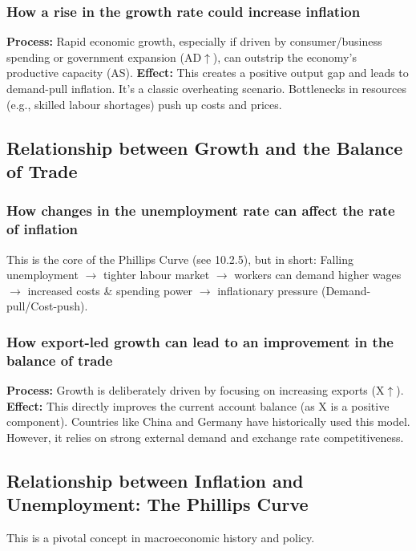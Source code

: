 \documentclass[11pt, a4paper, twoside]{book}
\begin{document}
\subsubsection{How a rise in the growth rate could increase inflation}

\textbf{Process:} Rapid economic growth, especially if driven by consumer/business spending or government expansion (AD$\uparrow$), can outstrip the economy's productive capacity (AS). \textbf{Effect:} This creates a positive output gap and leads to demand-pull inflation. It's a classic overheating scenario. Bottlenecks in resources (e.g., skilled labour shortages) push up costs and prices.

\subsection{Relationship between Growth and the Balance of Trade}

\subsubsection{How changes in the unemployment rate can affect the rate of inflation}

This is the core of the Phillips Curve (see 10.2.5), but in short: Falling unemployment $\rightarrow$ tighter labour market $\rightarrow$ workers can demand higher wages $\rightarrow$ increased costs \& spending power $\rightarrow$ inflationary pressure (Demand-pull/Cost-push).

\subsubsection{How export-led growth can lead to an improvement in the balance of trade}

\textbf{Process:} Growth is deliberately driven by focusing on increasing exports (X$\uparrow$). \textbf{Effect:} This directly improves the current account balance (as X is a positive component). Countries like China and Germany have historically used this model. However, it relies on strong external demand and exchange rate competitiveness.

\subsection{Relationship between Inflation and Unemployment: The Phillips Curve}

This is a pivotal concept in macroeconomic history and policy.
\end{document}
